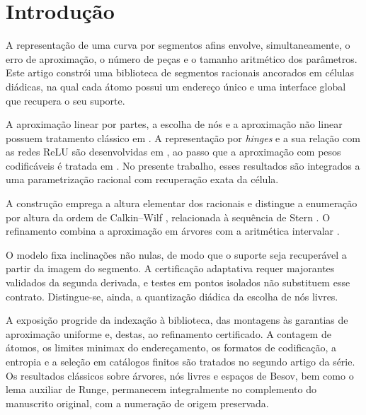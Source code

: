 \section{Introdução}
A representação de uma curva por segmentos afins envolve, simultaneamente, o erro de aproximação, o número de peças e o tamanho aritmético dos parâmetros. Este artigo constrói uma biblioteca de segmentos racionais ancorados em células diádicas, na qual cada átomo possui um endereço único e uma interface global que recupera o seu suporte.

A aproximação linear por partes, a escolha de nós e a aproximação não linear possuem tratamento clássico em \citet{artigo_1-deboor1973,artigo_1-burchard1974,artigo_1-deboor2001,artigo_1-powell1981,artigo_1-schumaker2007,artigo_1-devore1998}. A representação por \emph{hinges} e a sua relação com as redes ReLU são desenvolvidas em \citet{artigo_1-yarotsky2017,artigo_1-devore2021,artigo_1-daubechies2022}, ao passo que a aproximação com pesos codificáveis é tratada em \citet{artigo_1-petersen2018,artigo_1-elbrachter2021,artigo_1-bolcskei2019,artigo_1-guhring2021}. No presente trabalho, esses resultados são integrados a uma parametrização racional com recuperação exata da célula.

A construção emprega a altura elementar dos racionais \citep{artigo_1-bombieri2006} e distingue a enumeração por altura da ordem de Calkin--Wilf \citep{artigo_1-calkin2000}, relacionada à sequência de Stern \citep{artigo_1-stern1858,artigo_1-northshield2010}. O refinamento combina a aproximação em árvores \citep{artigo_1-cohen2001,artigo_1-binev2004,artigo_1-kessebohmer2025} com a aritmética intervalar \citep{artigo_1-moore2009,artigo_1-silva2025}.

O modelo fixa inclinações não nulas, de modo que o suporte seja recuperável a partir da imagem do segmento. A certificação adaptativa requer majorantes validados da segunda derivada, e testes em pontos isolados não substituem esse contrato. Distingue-se, ainda, a quantização diádica da escolha de nós livres.

A exposição progride da indexação à biblioteca, das montagens às garantias de aproximação uniforme e, destas, ao refinamento certificado. A contagem de átomos, os limites minimax do endereçamento, os formatos de codificação, a entropia e a seleção em catálogos finitos são tratados no segundo artigo da série. Os resultados clássicos sobre árvores, nós livres e espaços de Besov, bem como o lema auxiliar de Runge, permanecem integralmente no complemento do manuscrito original, com a numeração de origem preservada.

